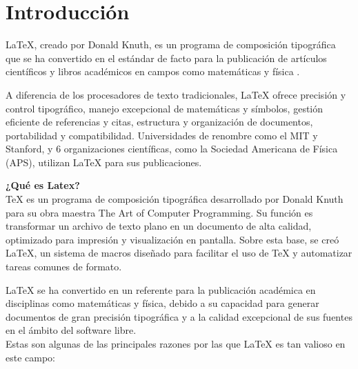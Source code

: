 \documentclass[12pt,twocolumn]{article}
\begin{document}

    \section{Introducción}
    LaTeX, creado por Donald Knuth, es un programa de composición tipográfica que se ha convertido en el estándar de facto para la publicación de artículos científicos y libros académicos en campos como matemáticas y física \parencite{knuth1997art}.

    A diferencia de los procesadores de texto tradicionales, LaTeX ofrece precisión y control tipográfico, manejo excepcional de matemáticas y símbolos, gestión eficiente de referencias y citas, estructura y organización de documentos, portabilidad y compatibilidad. 
    Universidades de renombre como el MIT y Stanford, y 6 organizaciones científicas, como la Sociedad Americana de Física (APS), utilizan LaTeX para sus publicaciones.

\textbf{¿Qué es Latex?}\\
TeX es un programa de composición tipográfica desarrollado por Donald Knuth para su obra maestra The Art of Computer Programming. 
Su función es transformar un archivo de texto plano en un documento de alta calidad, optimizado para impresión y visualización en pantalla. \textcite{poley2000latex} 
Sobre esta base, se creó LaTeX, un sistema de macros diseñado para facilitar el uso de TeX y automatizar tareas comunes de formato.

LaTeX se ha convertido en un referente para la publicación académica en disciplinas como matemáticas y física, debido a su capacidad para generar documentos de gran precisión tipográfica y a la calidad excepcional de sus fuentes en el ámbito del software libre.\\
Estas son algunas de las principales razones por las que LaTeX es tan valioso en este campo:
\end{document}
